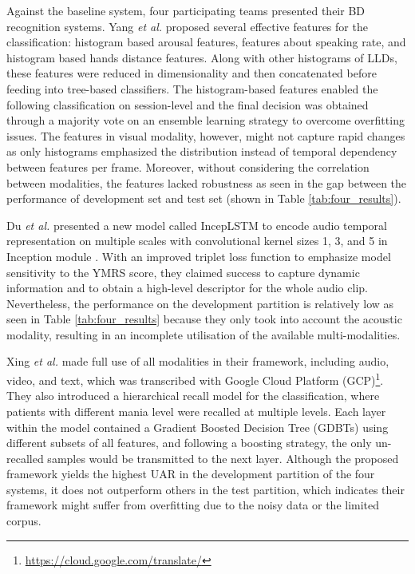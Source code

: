 Against the baseline system, four participating teams presented their BD recognition systems. Yang \textit{et al.} \cite{yang2018} proposed several effective features for the classification: histogram based arousal features, features about speaking rate, and histogram based hands distance features. Along with other histograms of LLDs, these features were reduced in dimensionality and then concatenated before feeding into tree-based classifiers. The histogram-based features enabled the following classification on session-level and the final decision was obtained through a majority vote on an ensemble learning strategy to overcome overfitting issues. The features in visual modality, however, might not capture rapid changes as only histograms emphasized the distribution instead of temporal dependency between features per frame. Moreover, without considering the correlation between modalities, the features lacked robustness as seen in the gap between the performance of development set and test set (shown in Table \ref{tab:four_results}). 

Du \textit{et al.} \cite{du2018} presented a new model called IncepLSTM to encode audio temporal representation on multiple scales with convolutional kernel sizes 1, 3, and 5 in Inception module \cite{szegedy2015}. With an improved triplet loss function to emphasize model sensitivity to the YMRS score, they claimed success to capture dynamic information and to obtain a high-level descriptor for the whole audio clip. Nevertheless, the performance on the development partition is relatively low as seen in Table \ref{tab:four_results} because they only took into account the acoustic modality, resulting in an incomplete utilisation of the available multi-modalities.

Xing \textit{et al.} \cite{xing2018} made full use of all modalities in their framework, including audio, video, and text, which was transcribed with Google Cloud Platform (GCP)\footnote{\url{https://cloud.google.com/translate/}}. They also introduced a hierarchical recall model for the classification, where patients with different mania level were recalled at multiple levels. Each layer within the model contained a Gradient Boosted Decision Tree (GDBTs) using different subsets of all features, and following a boosting strategy, the only un-recalled samples would be transmitted to the next layer. Although the proposed framework yields the highest UAR in the development partition of the four systems, it does not outperform others in the test partition, which indicates their framework might suffer from overfitting due to the noisy data or the limited corpus.

